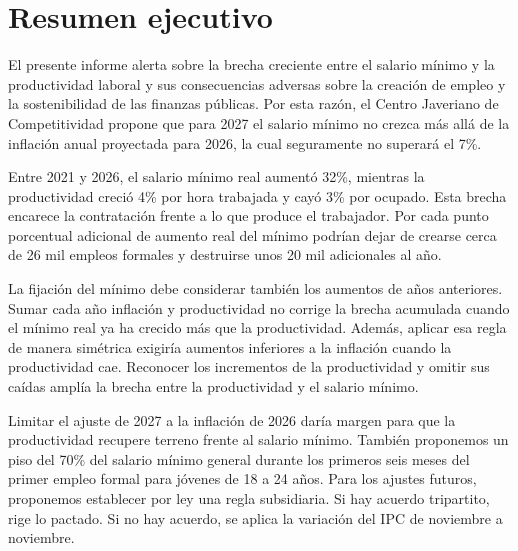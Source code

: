 \section*{Resumen ejecutivo}

El presente informe alerta sobre la brecha creciente entre el salario mínimo y la productividad laboral y sus consecuencias adversas sobre la creación de empleo y la sostenibilidad de las finanzas públicas. Por esta razón, el Centro Javeriano de Competitividad propone que para 2027 el salario mínimo no crezca más allá de la inflación anual proyectada para 2026, la cual seguramente no superará el 7\%.

Entre 2021 y 2026, el salario mínimo real aumentó 32\%, mientras la productividad creció 4\% por hora trabajada y cayó 3\% por ocupado. Esta brecha encarece la contratación frente a lo que produce el trabajador. Por cada punto porcentual adicional de aumento real del mínimo podrían dejar de crearse cerca de 26 mil empleos formales y destruirse unos 20 mil adicionales al año.

La fijación del mínimo debe considerar también los aumentos de años anteriores. Sumar cada año inflación y productividad no corrige la brecha acumulada cuando el mínimo real ya ha crecido más que la productividad. Además, aplicar esa regla de manera simétrica exigiría aumentos inferiores a la inflación cuando la productividad cae. Reconocer los incrementos de la productividad y omitir sus caídas amplía la brecha entre la productividad y el salario mínimo.

Limitar el ajuste de 2027 a la inflación de 2026 daría margen para que la productividad recupere terreno frente al salario mínimo. También proponemos un piso del 70\% del salario mínimo general durante los primeros seis meses del primer empleo formal para jóvenes de 18 a 24 años. Para los ajustes futuros, proponemos establecer por ley una regla subsidiaria. Si hay acuerdo tripartito, rige lo pactado. Si no hay acuerdo, se aplica la variación del IPC de noviembre a noviembre.
\clearpage
